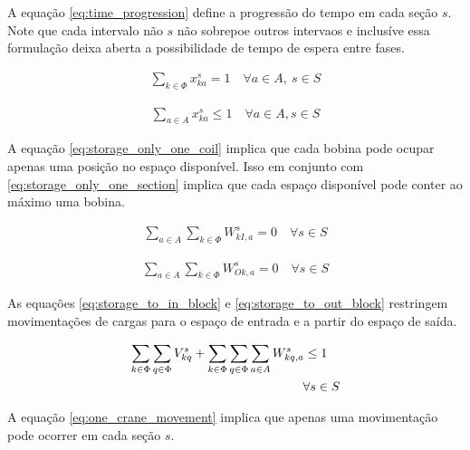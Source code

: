 \documentclass[journal]{IEEEtran}
\begin{document}
        A equação \ref{eq:time_progression} define a progressão do tempo em cada
         seção $s$.
        Note que cada intervalo não $s$ não sobrepoe outros intervaos e inclusíve
        essa formulação deixa aberta a possibilidade de tempo de espera entre fases.
        
        \begin{align}
            \sum_{k \in \Phi} x^s_{ka} = 1 \quad \forall a \in A,\ s \in S
            \label{eq:storage_only_one_coil}
        \end{align}

        \begin{align}
            \sum_{a \in A} x^s_{ka} \leq 1 \quad \forall a \in A, s \in S
            \label{eq:storage_only_one_section}
        \end{align}

        A equação \ref{eq:storage_only_one_coil} implica que cada bobina pode 
        ocupar apenas uma posição no espaço disponível. Isso em conjunto com 
        \ref{eq:storage_only_one_section} implica que cada espaço disponível 
        pode conter ao máximo uma bobina.

        \begin{align}
            \sum_{a \in A}
            \sum_{k \in \Phi}
            W^s_{kI, a} = 0 \quad \forall s \in S 
            \label{eq:storage_to_in_block}
        \end{align}

        \begin{align}
            \sum_{a \in A}
            \sum_{k \in \Phi}
            W^s_{Ok, a} = 0 \quad \forall s \in S 
            \label{eq:storage_to_out_block}
        \end{align}
        
        As equações \ref{eq:storage_to_in_block} e \ref{eq:storage_to_out_block}
        restringem movimentações de cargas para o espaço de entrada e a partir do
        espaço de saída.

        \begin{align}
            \sum_{k \in \Phi} \sum_{q \in \Phi} V^s_{kq} + \sum_{k \in \Phi} \sum_{q \in \Phi} \sum_{a \in A} W^s_{kq,a} \leq 1 \quad \notag \\
            \forall s \in S
            \label{eq:one_crane_movement}
        \end{align}

        A equação \ref{eq:one_crane_movement} implica que apenas uma movimentação
        pode ocorrer em cada seção $s$.
\end{document}
